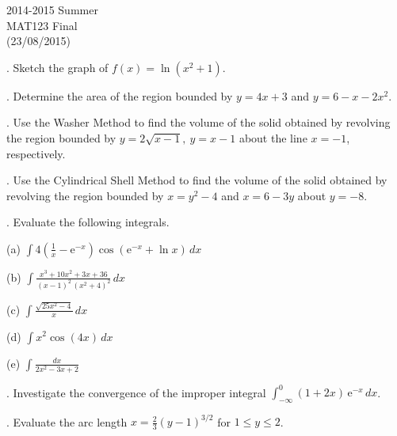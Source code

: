 \documentclass{article}
\begin{document}
\pagestyle{empty}
\large

\begin{center}
2014-2015 Summer \\MAT123 Final\\(23/08/2015)
\end{center}

. Sketch the graph of $f(x)=\ln\left(x^2+1\right)$.

\hfill

. Determine the area of the region bounded by $y=4x+3$ and $y=6-x-2x^2$.

\hfill

. Use the Washer Method to find the volume of the solid obtained by revolving the region bounded by $y=2\sqrt{x-1},\: y=x-1$ about the line $x=-1$, respectively.

\hfill

. Use the Cylindrical Shell Method to find the volume of the solid obtained by revolving the region bounded by $x=y^2-4$ and $x=6-3y$ about $y=-8$.

\hfill

. Evaluate the following integrals.

\hfill

(a) $\displaystyle\int4\left(\frac1x-\mathrm{e}^{-x}\right)\cos\left(\mathrm{e}^{-x}+\ln x\right)\,dx$

\hfill

\hfill

(b) $\displaystyle\int\frac{x^3+10x^2+3x+36}{(x-1)^2\,\left(x^2+4\right)^2}\,dx$

\hfill

\hfill

(c) $\displaystyle\int\frac{\sqrt{25x^2-4}}{x}\,dx$

\hfill

\hfill

(d) $\displaystyle\int x^2\cos(4x)\,dx$

\hfill

\hfill

(e) $\displaystyle\int\frac{dx}{2x^2-3x+2}$

\hfill

. Investigate the convergence of the improper integral $\displaystyle\int_{-\infty}^0(1+2x)\,\mathrm{e}^{-x}\,dx$.

\hfill

. Evaluate the arc length $\displaystyle x=\frac23(y-1)^{3/2}$ for $1\leq y\leq2$.
\end{document}
